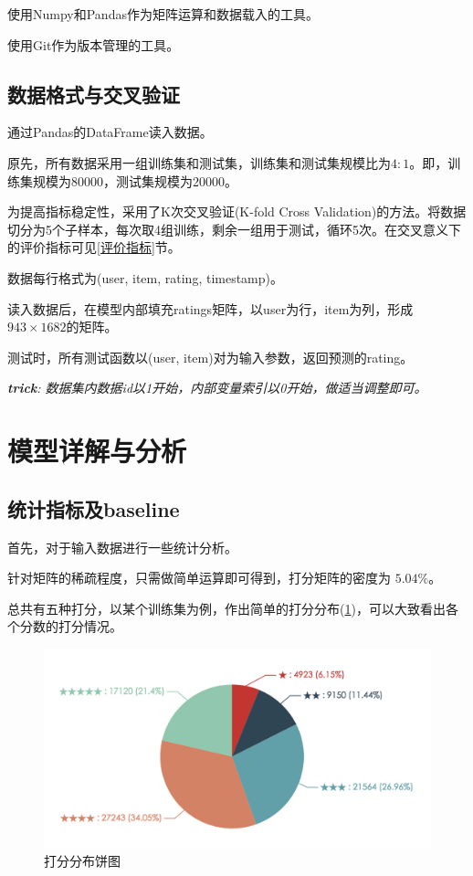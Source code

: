 \documentclass[utf8, a4paper, 11pt, onecolumn]{ctexart}
\begin{document}
\begin{spacing}{1.3}
使用Numpy和Pandas作为矩阵运算和数据载入的工具。

使用Git作为版本管理的工具。

\subsection{数据格式与交叉验证}

通过Pandas的DataFrame读入数据。

原先，所有数据采用一组训练集和测试集，训练集和测试集规模比为$4:1$。即，训练集规模为80000，测试集规模为20000。

为提高指标稳定性，采用了K次交叉验证(K-fold Cross Validation)的方法。将数据切分为5个子样本，每次取4组训练，剩余一组用于测试，循环5次。在交叉意义下的评价指标可见\ref{评价指标}节。

数据每行格式为(user, item, rating, timestamp)。

读入数据后，在模型内部填充ratings矩阵，以user为行，item为列，形成$943 \times 1682$的矩阵。

测试时，所有测试函数以(user, item)对为输入参数，返回预测的rating。

\textit{\textbf{trick}: 数据集内数据id以1开始，内部变量索引以0开始，做适当调整即可。}
\section{模型详解与分析}
\label{模型详解}
\subsection{统计指标及baseline}

首先，对于输入数据进行一些统计分析。

针对矩阵的稀疏程度，只需做简单运算即可得到，打分矩阵的密度为 $5.04\%$。

总共有五种打分，以某个训练集为例，作出简单的打分分布(\ref{rating-pie})，可以大致看出各个分数的打分情况。

\begin{figure}
	\centering
	\includegraphics[width=1.0\linewidth]{rating-pie.png}
	\caption{打分分布饼图}
	\label{rating-pie}
\end{figure}


\end{spacing}
\end{document}
